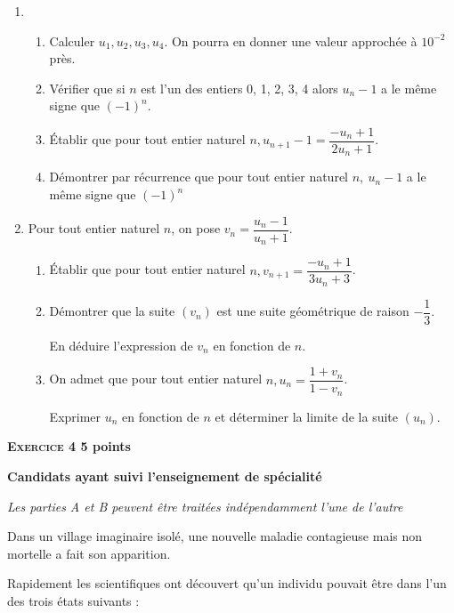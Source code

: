 \documentclass[10pt]{article}
\begin{document}
\begin{enumerate}
\item 
	\begin{enumerate}
		\item Calculer $u_{1}, u_{2}, u_{3}, u_{4}$. On pourra en donner une valeur approchée à $10^{-2}$ près. 
		\item Vérifier que si $n$ est l'un des entiers 0, 1, 2, 3, 4 alors $u_{n} - 1$ a le même signe que $(- 1)^n$. 
		\item Établir que pour tout entier naturel $n, u_{n+ 1} - 1 = \dfrac{- u_{n} + 1}{ 2u_{n} + 1}$. 
		\item Démontrer par récurrence que pour tout entier naturel $n, \:u_{n} - 1$ a le même signe que $(- 1)^n$	
	\end{enumerate} 
\item Pour tout entier naturel $n$, on pose $v_{n} = \dfrac{u_{n} - 1}{u_{n} + 1}$. 
	\begin{enumerate}
		\item Établir que pour tout entier naturel $n, 
 v_{n+1} = \dfrac{- u_{n} + 1}{3u_{n} + 3}$. 
		\item Démontrer que la suite $\left(v_{n}\right)$ est une suite géométrique de raison $- \dfrac{1}{3}$.
		
En déduire l'expression de $v_{n}$ en fonction de $n$. 
		\item On admet que pour tout entier naturel $n, u_{n} =  \dfrac{1 + v_{n}}{1 - v_{n}}$.
		  
Exprimer $u_{n}$ en fonction de $n$ et déterminer la limite de la suite $\left(u_{n}\right)$.
	\end{enumerate}
\end{enumerate}

\vspace{0,5cm}

\textbf{\textsc{Exercice 4} \hfill 5 points}
 
\textbf{Candidats ayant suivi l'enseignement de spécialité}

\medskip

\emph{Les parties A et B peuvent être traitées indépendamment l'une de l'autre}

\medskip
 
Dans un village imaginaire isolé, une nouvelle maladie contagieuse mais non mortelle a fait son apparition.
 
Rapidement les scientifiques ont découvert qu'un individu pouvait être dans l'un des trois états suivants :
\end{document}
